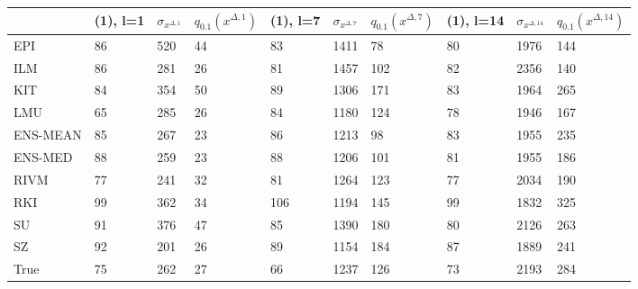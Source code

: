 \begin{tabular}{llllllllll}
\toprule
 & (1), l=1 & $\sigma_{x^{\Delta, 1}}$ & $q_{0.1} (x^{\Delta, 1})$ & (1), l=7 & $\sigma_{x^{\Delta, 7}}$ & $q_{0.1} (x^{\Delta, 7})$ & (1), l=14 & $\sigma_{x^{\Delta, 14}}$ & $q_{0.1} (x^{\Delta, 14})$ \\
\midrule
EPI & 86 & 520 & 44 & 83 & 1411 & 78 & 80 & 1976 & 144 \\
ILM & 86 & 281 & 26 & 81 & 1457 & 102 & 82 & 2356 & 140 \\
KIT & 84 & 354 & 50 & 89 & 1306 & 171 & 83 & 1964 & 265 \\
LMU & 65 & 285 & 26 & 84 & 1180 & 124 & 78 & 1946 & 167 \\
ENS-MEAN & 85 & 267 & 23 & 86 & 1213 & 98 & 83 & 1955 & 235 \\
ENS-MED & 88 & 259 & 23 & 88 & 1206 & 101 & 81 & 1955 & 186 \\
RIVM & 77 & 241 & 32 & 81 & 1264 & 123 & 77 & 2034 & 190 \\
RKI & 99 & 362 & 34 & 106 & 1194 & 145 & 99 & 1832 & 325 \\
SU & 91 & 376 & 47 & 85 & 1390 & 180 & 80 & 2126 & 263 \\
SZ & 92 & 201 & 26 & 89 & 1154 & 184 & 87 & 1889 & 241 \\
True & 75 & 262 & 27 & 66 & 1237 & 126 & 73 & 2193 & 284 \\
\bottomrule
\end{tabular}
